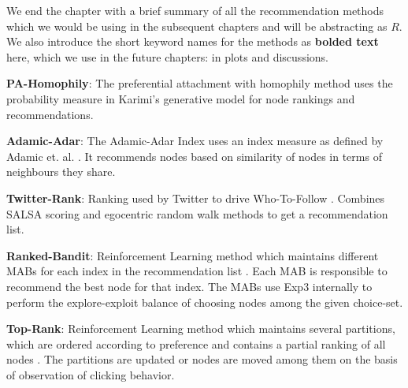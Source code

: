 We end the chapter with a brief summary of all the recommendation methods which we would be using in the subsequent chapters and will be abstracting as $R$. We also introduce the short keyword names for the methods as \textbf{bolded text} here, which we use in the future chapters: in plots and discussions.

\textbf{PA-Homophily}: The preferential attachment with homophily method uses the probability measure in Karimi's generative model \cite{karimi2018homophily} for node rankings and recommendations.

\textbf{Adamic-Adar}: The Adamic-Adar Index uses an index measure as defined by Adamic et. al. \cite{adamic2003friends}. It recommends nodes based on similarity of nodes in terms of neighbours they share.

\textbf{Twitter-Rank}: Ranking used by Twitter to drive Who-To-Follow \cite{gupta2013wtf}. Combines SALSA scoring and egocentric random walk methods to get a recommendation list.

\textbf{Ranked-Bandit}: Reinforcement Learning method which maintains different MABs for each index in the recommendation list \cite{radlinski2008learning}. Each MAB is responsible to recommend the best node for that index. The MABs use Exp3 internally to perform the explore-exploit balance of choosing nodes among the given choice-set.

\textbf{Top-Rank}: Reinforcement Learning method which maintains several partitions, which are ordered according to preference and contains a partial ranking of all nodes \cite{lattimore2018toprank}. The partitions are updated or nodes are moved among them on the basis of observation of clicking behavior. 